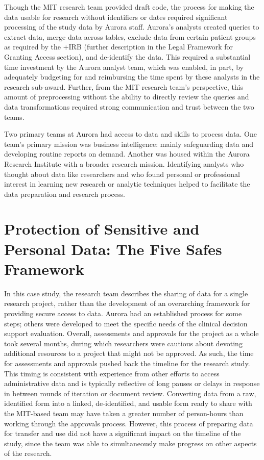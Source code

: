 \documentclass[
]{book}
\begin{document}
Though the MIT research team provided draft code, the process for making the data usable for research without identifiers or dates required significant processing of the study data by Aurora staff. Aurora's analysts created queries to extract data, merge data across tables, exclude data from certain patient groups as required by the +IRB\textbar{} (further description in the Legal Framework for Granting Access section), and de-identify the data. This required a substantial time investment by the Aurora analyst team, which was enabled, in part, by adequately budgeting for and reimbursing the time spent by these analysts in the research sub-award. Further, from the MIT research team's perspective, this amount of preprocessing without the ability to directly review the queries and data transformations required strong communication and trust between the two teams.

Two primary teams at Aurora had access to data and skills to process data. One team's primary mission was business intelligence: mainly safeguarding data and developing routine reports on demand. Another was housed within the Aurora Research Institute with a broader research mission. Identifying analysts who thought about data like researchers and who found personal or professional interest in learning new research or analytic techniques helped to facilitate the data preparation and research process.

\hypertarget{protection-of-sensitive-and-personal-data-the-five-safes-framework-4}{%
\section{Protection of Sensitive and Personal Data: The Five Safes Framework}\label{protection-of-sensitive-and-personal-data-the-five-safes-framework-4}}

In this case study, the research team describes the sharing of data for a single research project, rather than the development of an overarching framework for providing secure access to data. Aurora had an established process for some steps; others were developed to meet the specific needs of the clinical decision support evaluation. Overall, assessments and approvals for the project as a whole took several months, during which researchers were cautious about devoting additional resources to a project that might not be approved. As such, the time for assessments and approvals pushed back the timeline for the research study. This timing is consistent with experience from other efforts to access administrative data and is typically reflective of long pauses or delays in response in between rounds of iteration or document review. Converting data from a raw, identified form into a linked, de-identified, and usable form ready to share with the MIT-based team may have taken a greater number of person-hours than working through the approvals process. However, this process of preparing data for transfer and use did not have a significant impact on the timeline of the study, since the team was able to simultaneously make progress on other aspects of the research.
\end{document}

